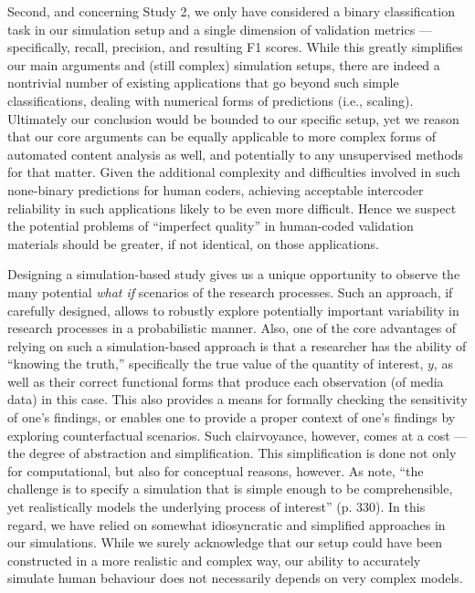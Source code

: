 \documentclass[man, floatsintext, 12pt, a4paper, noextraspace]{apa6}
\begin{document}
    Second, and concerning Study 2, we only have considered a binary classification task in our simulation setup and a single dimension of validation metrics --- specifically, recall, precision, and resulting F1 scores. While this greatly simplifies our main arguments and (still complex) simulation setups, there are indeed a nontrivial number of existing applications that go beyond such simple classifications, dealing with numerical forms of predictions (i.e., scaling). Ultimately our conclusion would be bounded to our specific setup, yet we reason that our core arguments can be equally applicable to more complex forms of automated content analysis as well, and potentially to any unsupervised methods for that matter. Given the additional complexity and difficulties involved in such none-binary predictions for human coders, achieving acceptable intercoder reliability in such applications likely to be even more difficult. Hence we suspect the potential problems of \enquote{imperfect quality} in human-coded validation materials should be greater, if not identical, on those applications. 

    Designing a simulation-based study gives us a unique opportunity to observe the many potential \textit{what if} scenarios of the research processes. Such an approach, if carefully designed, allows to robustly explore potentially important variability in research processes in a probabilistic manner. Also, one of the core advantages of relying on such a simulation-based approach is that a researcher has the ability of \enquote{knowing the truth,} specifically the true value of the quantity of interest, $y$, as well as their correct functional forms that produce each observation (of media data) in this case. This also provides a means for formally checking the sensitivity of one’s findings, or enables one to provide a proper context of one's findings by exploring counterfactual scenarios. Such clairvoyance, however, comes at a cost --- the degree of abstraction and simplification. This simplification is done not only for computational, but also for conceptual reasons, however. As \textcite{scharkow2017measurement} note, \enquote{the challenge is to specify a simulation that is simple enough to be comprehensible, yet realistically models the underlying process of interest} (p. 330). In this regard, we have relied on somewhat idiosyncratic and simplified approaches in our simulations. While we surely acknowledge that our setup could have been constructed in a more realistic and complex way, our ability to accurately simulate human behaviour does not necessarily depends on very complex models. 
\end{document}
